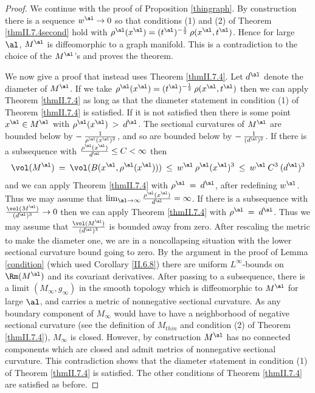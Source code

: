 \begin{proof}

We continue with the proof of Proposition \ref{thingraph}.
By construction there is a sequence $w^\al \rightarrow 0$ so that
conditions (1) and (2) of Theorem \ref{thmII.7.4second} hold
with $\rho^\al(x^\al) = (t^\al)^{- \frac12} \: \rho(x^\al, t^\al)$.
Hence for large $\al$, $M^\al$ is
diffeomorphic to a graph manifold.  This is a contradiction to the choice of
the $M^\al$'s and proves the theorem.

We now give a proof that instead uses Theorem \ref{thmII.7.4}.
Let $d^\al$ denote the diameter of $M^\al$.
If we take $\rho^\al(x^\al) = (t^\al)^{- \frac12} \: \rho(x^\al, t^\al)$
then we can apply Theorem \ref{thmII.7.4} as long as
that the diameter statement in condition (1) of Theorem \ref{thmII.7.4} is
satisfied.
If it is not satisfied then there is some point $x^\al \in M^\al$ with
$\rho^\al(x^\al) \: > \:  d^\al$.
The sectional curvatures of $M^\al$ are bounded below by
$- \: \frac{1}{\rho^\al(x^\al)^2}$, and so are bounded below by
$- \: \frac{1}{(d^\al)^2}$.
If there is a subsequence  with
$\frac{\rho^\al(x^\al)}{d^\al} \le C < \infty$  then
\begin{equation}
\vol(M^\al) \: = \: \vol(B(x^\al, \rho^\al(x^\al))) \: \le \: w^\al \:
\rho^\al(x^\al)^3 \: \le \: w^\al \: C^3 \: (d^\al)^3
\end{equation}
and we can apply Theorem \ref{thmII.7.4} with $\rho^\al \: = \: d^\al$,
after redefining $w^\al$.
Thus we may assume that
$\lim_{\al \rightarrow \infty} \frac{\rho^\al(x^\al)}{d^\al} = \infty$.
If there is a subsequence with
$\frac{\vol(M^\al)}{(d^\al)^3}  \rightarrow 0$ then we
can apply Theorem \ref{thmII.7.4} with $\rho^\al \: = \: d^\al$.
Thus we may assume that $\frac{\vol(M^\al)}{(d^\al)^3}$ is bounded away from zero.
After rescaling the metric to make the diameter one, we are in a
noncollapsing situation
with the lower sectional curvature bound going to zero.
By the argument in the proof of Lemma \ref{condition} (which used
Corollary \ref{II.6.8}) there are uniform $L^\infty$-bounds on $\Rm(M^\al)$ and
its covariant derivatives.  After passing to a subsequence, there is a
limit $(M_\infty, g_\infty)$ in the smooth topology which is diffeomorphic
to $M^\al$ for large $\al$, and carries a metric of nonnegative sectional curvature.
As any boundary component of $M_\infty$ would have to have a neighborhood
of negative sectional curvature (see
the definition of $M_{thin}$ and
condition (2) of Theorem \ref{thmII.7.4}),
$M_\infty$ is closed. However, by construction $M^\al$ has no connected components
which are closed and admit metrics of nonnegative sectional curvature.
 This contradiction shows that the diameter statement in condition
(1) of Theorem \ref{thmII.7.4} is satisfied. The other conditions of
Theorem \ref{thmII.7.4} are satisfied as before.
\end{proof}

